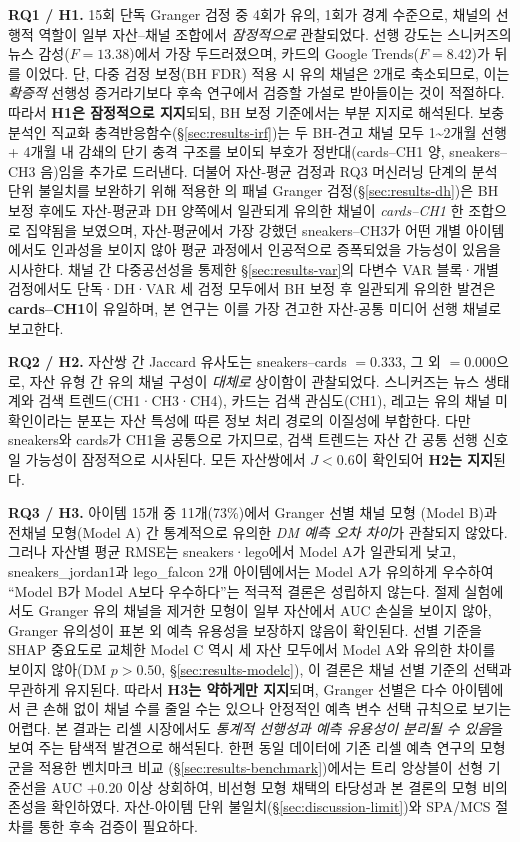 \documentclass[11pt, a4paper, twocolumn]{article}
\begin{document}
\textbf{RQ1 / H1.} 15회 단독 Granger 검정 중 4회가 유의, 1회가 경계 수준으로,
채널의 선행적 역할이 일부 자산--채널 조합에서 \emph{잠정적으로}
관찰되었다. 선행 강도는 스니커즈의 뉴스 감성($F=13.38$)에서 가장
두드러졌으며, 카드의 Google Trends($F=8.42$)가 뒤를 이었다. 단, 다중
검정 보정(BH FDR) 적용 시 유의 채널은 2개로 축소되므로, 이는 \emph{확증적}
선행성 증거라기보다 후속 연구에서 검증할 가설로 받아들이는 것이 적절하다.
따라서 \textbf{H1은 잠정적으로 지지}되되, BH 보정 기준에서는 부분 지지로
해석된다. 보충 분석인 직교화 충격반응함수(\S\ref{sec:results-irf})는 두
BH-견고 채널 모두 1\textasciitilde2개월 선행 + 4개월 내 감쇄의 단기 충격
구조를 보이되 부호가 정반대(cards--CH1 양, sneakers--CH3 음)임을 추가로
드러낸다. 더불어 자산-평균 검정과 RQ3 머신러닝 단계의 분석 단위
불일치를 보완하기 위해 적용한 \citet{dumitrescuhurlin2012}의 패널
Granger 검정(\S\ref{sec:results-dh})은 BH 보정 후에도 자산-평균과 DH
양쪽에서 일관되게 유의한 채널이 \emph{cards--CH1} 한 조합으로 집약됨을
보였으며, 자산-평균에서 가장 강했던 sneakers--CH3가 어떤 개별
아이템에서도 인과성을 보이지 않아 평균 과정에서 인공적으로 증폭되었을
가능성이 있음을 시사한다. 채널 간 다중공선성을 통제한
\S\ref{sec:results-var}의 다변수 VAR 블록·개별 검정에서도 단독·DH·VAR
세 검정 모두에서 BH 보정 후 일관되게 유의한 발견은 \textbf{cards--CH1}이
유일하며, 본 연구는 이를 가장 견고한 자산-공통 미디어 선행 채널로
보고한다.

\textbf{RQ2 / H2.} 자산쌍 간 Jaccard 유사도는 sneakers--cards $=0.333$,
그 외 $=0.000$으로, 자산 유형 간 유의 채널 구성이 \emph{대체로} 상이함이
관찰되었다. 스니커즈는 뉴스 생태계와 검색 트렌드(CH1·CH3·CH4), 카드는
검색 관심도(CH1), 레고는 유의 채널 미확인이라는 분포는 자산 특성에 따른
정보 처리 경로의 이질성에 부합한다. 다만 sneakers와 cards가 CH1을
공통으로 가지므로, 검색 트렌드는 자산 간 공통 선행 신호일 가능성이
잠정적으로 시사된다. 모든 자산쌍에서 $J<0.6$이 확인되어 \textbf{H2는
지지}된다.

\textbf{RQ3 / H3.} 아이템 15개 중 11개(73\%)에서 Granger 선별 채널 모형
(Model B)과 전채널 모형(Model A) 간 통계적으로 유의한 \emph{DM 예측
오차 차이}가 관찰되지 않았다. 그러나 자산별 평균 RMSE는 sneakers·lego에서
Model A가 일관되게 낮고, \textsf{sneakers\_jordan1}과 \textsf{lego\_falcon}
2개 아이템에서는 Model A가 유의하게 우수하여 ``Model B가 Model A보다
우수하다''는 적극적 결론은 성립하지 않는다. 절제 실험에서도 Granger 유의
채널을 제거한 모형이 일부 자산에서 AUC 손실을 보이지 않아, Granger
유의성이 표본 외 예측 유용성을 보장하지 않음이 확인된다. 선별 기준을
SHAP 중요도로 교체한 Model C 역시 세 자산 모두에서 Model A와 유의한
차이를 보이지 않아(DM $p>0.50$, \S\ref{sec:results-modelc}), 이 결론은
채널 선별 기준의 선택과 무관하게 유지된다. 따라서
\textbf{H3는 약하게만 지지}되며, Granger 선별은 다수 아이템에서 큰 손해
없이 채널 수를 줄일 수는 있으나 안정적인 예측 변수 선택 규칙으로 보기는
어렵다. 본 결과는 리셀 시장에서도 \emph{통계적 선행성과 예측 유용성이
분리될 수 있음}을 보여 주는 탐색적 발견으로 해석된다. 한편 동일
데이터에 기존 리셀 예측 연구의 모형군을 적용한 벤치마크 비교
(\S\ref{sec:results-benchmark})에서는 트리 앙상블이 선형 기준선을
AUC $+0.20$ 이상 상회하여, 비선형 모형 채택의 타당성과 본 결론의
모형 비의존성을 확인하였다.
자산-아이템 단위 불일치(\S\ref{sec:discussion-limit})와 SPA/MCS 절차를
통한 후속 검증이 필요하다.
\end{document}
